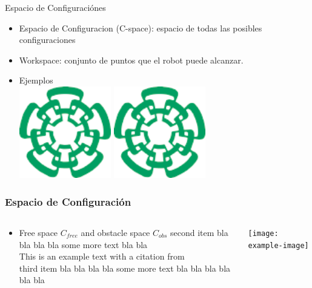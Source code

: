 \documentclass[
	11pt, %
]{beamer}
\begin{document}
\begin{frame}{Espacio de Configuraci\'{o}nes}
  \begin{itemize}
  \item <1-> Espacio de Configuracion (C-space): espacio de todas las posibles configuraciones
  \item <2-> Workspace: conjunto de puntos que el robot puede alcanzar.
  \item Ejemplos\\
    \centering
    \includegraphics[angle=45,width=4cm]{cinvestavlogo}
    \includegraphics[angle=45,width=4cm]{cinvestavlogo}
  \end{itemize}
\end{frame}

\begin{frame}
  \frametitle{Espacio de Configuraci\'{o}n}
  \setlength{\leftmargini}{0.5em}
  \begin{columns}[c, onlytextwidth]%
    \begin{column}{.5\textwidth}%
      \setlength{\partopsep}{0pt}%
      \begin{itemize}
        \itemsep 1.5em
      \item Free space $C_{free}$ and obstacle space $C_{obs}$
        second item bla bla bla bla some more text bla bla\\
        This is an example text with a citation from\\
        third item bla bla bla bla some more text bla bla bla bla bla bla
      \end{itemize}
    \end{column}%
    \begin{column}{.45\textwidth}
      \begin{center}
        \texttt{[image: example-image]}
      \end{center}
    \end{column}%
\end{columns}
\end{frame}
\end{document}
